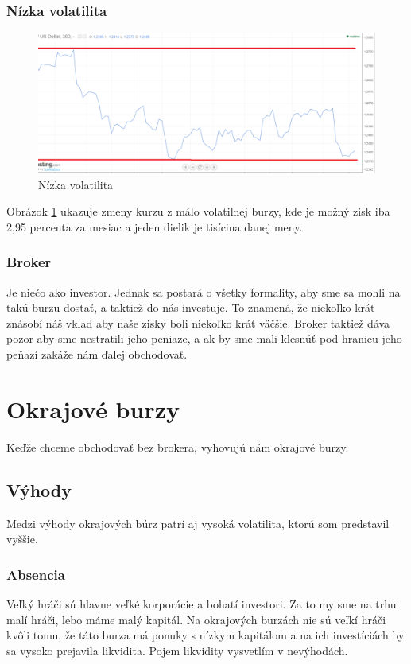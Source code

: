 \subsubsection{Nízka volatilita}  
\begin{figure}[!hbt]
\begin{center}
\includegraphics[width=1\textwidth]{obr2}
\caption{Nízka volatilita}
\label{img:nvolat}
\end{center}
\end{figure}
Obrázok \ref{img:nvolat} ukazuje zmeny kurzu z málo volatilnej burzy, kde je  možný zisk iba 2,95 percenta za mesiac a jeden dielik je tisícina danej meny.   
\subsubsection{Broker} 
Je niečo ako investor. Jednak sa postará o všetky formality, aby sme sa mohli na takú burzu dostať, a taktiež do nás investuje. To znamená, že niekoľko krát znásobí náš vklad aby naše zisky boli niekoľko krát väčšie. Broker taktiež dáva pozor aby sme nestratili jeho peniaze, a ak by sme mali klesnúť pod hranicu jeho peňazí zakáže nám ďalej obchodovať. \cite{ZAC}  
\section{Okrajové burzy}
Keďže chceme obchodovať bez brokera, vyhovujú nám okrajové burzy.
\subsection{Výhody} 
Medzi výhody okrajových búrz patrí aj vysoká volatilita, ktorú som predstavil vyššie.
\subsubsection{Absencia } 
Veľký hráči\cite{ZAC} sú hlavne veľké korporácie a bohatí investori. Za to my sme na trhu malí hráči, lebo máme malý kapitál. Na okrajových burzách nie sú veľkí hráči kvôli tomu, že táto burza má ponuky s nízkym kapitálom a na ich investíciách by sa vysoko prejavila likvidita. Pojem likvidity vysvetlím v nevýhodách.
